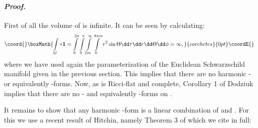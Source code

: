 \documentclass[a4paper,12pt,draft]{article}
\newenvironment{proof}{\paragraph{\it Proof.}}{\myHighlight{$\square$}\coordHE{}\vskip0.4cm}
\begin{document}
\begin{proof} First of all the volume of \coordHE{} is infinite. It can be
seen by calculating:
\[\coord{}\boxMath{\int\limits_M*{\bf 1}
=\int\limits_0^{2\pi}\int\limits_0^\pi\int\limits_{2m}^\infty\int\limits_0^
{8\pi m}r^2\sin\Theta\dd\tau\dd r\dd\Theta\dd\phi =\infty,}{corchetes}{0pt}\coordE{}\] 
where we have used again the parameterization of the Euclidean
Schwarzschild manifold given in the previous section. 
This implies that there are no \coordHE{} harmonic \coordHE{}- or equivalently
\coordHE{}-forms. Now, as \coordHE{} is Ricci-flat and complete, 
Corollary 1 of Dodziuk \cite{dodziuk} implies that there
are no \coordHE{}- and equivalently \coordHE{}-forms on \coordHE{}. 

It remains to show that any \coordHE{} harmonic \coordHE{}-form is a linear combination 
of \myHighlight{$\dd\xi$}\coordHE{} and \myHighlight{$*\dd\xi$}\coordHE{}. For this we use a recent result of Hitchin,
namely Theorem 3 of
\cite{hitchin} which we cite in full:


\end{proof}
\end{document}
